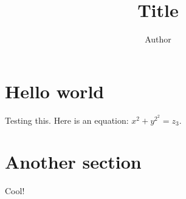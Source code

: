 \documentclass{article}
\title{Title}
\author{Author}
\begin{document}
\section{Hello world}

Testing this. Here is an equation: \(x^2+y^{2^2}=z_3\).

\section{Another section}

Cool!
\end{document}

